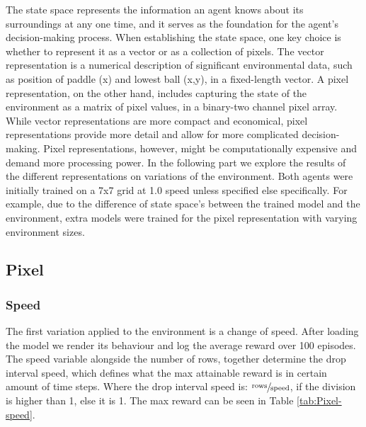 \documentclass{article}
\begin{document}
The state space represents the information an agent knows about its surroundings at any one time, and it serves as the foundation for the agent's decision-making process. 
When establishing the state space, one key choice is whether to represent it as a vector or as a collection of pixels.
The vector representation is a numerical description of significant environmental data, such as position of paddle (x) and lowest ball (x,y), in a fixed-length vector.
A pixel representation, on the other hand, includes capturing the state of the environment as a matrix of pixel values, in a binary-two channel pixel array.
While vector representations are more compact and economical, pixel representations provide more detail and allow for more complicated decision-making.
Pixel representations, however, might be computationally expensive and demand more processing power.
In the following part we explore the results of the different representations on variations of the environment.
Both agents were initially trained on a 7x7 grid at 1.0 speed unless specified else specifically.
For example, due to the difference of state space's between the trained model and the environment, extra models were trained for the pixel representation with varying environment sizes.


\subsection{Pixel}
\label{ENV-PV}

\subsubsection{Speed}
The first variation applied to the environment is a change of speed.
After loading the model we render its behaviour and log the average reward over 100 episodes. 
The speed variable alongside the number of rows, together determine the drop interval speed, which defines what the max attainable reward is in certain amount of time steps. 
Where the drop interval speed is: $\sfrac{\text{rows}}{\text{speed}}$, if the division is higher than 1, else it is 1. 
The max reward can be seen in Table \ref{tab:Pixel-speed}. 
\end{document}
